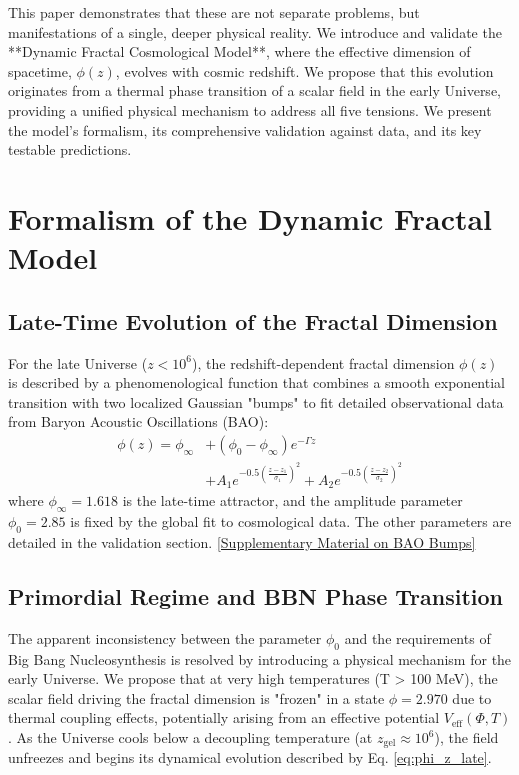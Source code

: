 \documentclass[aps,prl,twocolumn,groupedaddress]{revtex4-2}
\newcommand{\optPhiInf}{1.618}
\newcommand{\phiZeroVal}{2.85}       %
\newcommand{\optPhiBBN}{2.970}       %
\begin{document}
This paper demonstrates that these are not separate problems, but manifestations of a single, deeper physical reality. We introduce and validate the **Dynamic Fractal Cosmological Model**, where the effective dimension of spacetime, $\phi(z)$, evolves with cosmic redshift. We propose that this evolution originates from a thermal phase transition of a scalar field in the early Universe, providing a unified physical mechanism to address all five tensions. We present the model's formalism, its comprehensive validation against data, and its key testable predictions.

\section{Formalism of the Dynamic Fractal Model}

\subsection{Late-Time Evolution of the Fractal Dimension}
For the late Universe ($z < 10^6$), the redshift-dependent fractal dimension $\phi(z)$ is described by a phenomenological function that combines a smooth exponential transition with two localized Gaussian "bumps" to fit detailed observational data from Baryon Acoustic Oscillations (BAO):
\begin{equation}
\begin{split}
\phi(z) = \phi_{\infty} &+ (\phi_0 - \phi_{\infty}) e^{-\Gamma z} \\
&+ A_1 e^{-0.5\left(\frac{z - z_1}{\sigma_1}\right)^2} + A_2 e^{-0.5\left(\frac{z - z_2}{\sigma_2}\right)^2}
\end{split}
\label{eq:phi_z_late}
\end{equation}
where $\phi_{\infty} = \optPhiInf$ is the late-time attractor, and the amplitude parameter $\phi_0 = \phiZeroVal$ is fixed by the global fit to cosmological data. The other parameters are detailed in the validation section. \href{https://phi-z.space/methods/physical_justification_phi_z_bumps.pdf}{[Supplementary Material on BAO Bumps]}

\subsection{Primordial Regime and BBN Phase Transition}
The apparent inconsistency between the parameter $\phi_0$ and the requirements of Big Bang Nucleosynthesis is resolved by introducing a physical mechanism for the early Universe. We propose that at very high temperatures (T > 100 MeV), the scalar field driving the fractal dimension is "frozen" in a state $\phi = \optPhiBBN$ due to thermal coupling effects, potentially arising from an effective potential $V_{\text{eff}}(\Phi, T)$. As the Universe cools below a decoupling temperature (at $z_{\text{gel}} \approx 10^6$), the field unfreezes and begins its dynamical evolution described by Eq. \eqref{eq:phi_z_late}.
\end{document}
